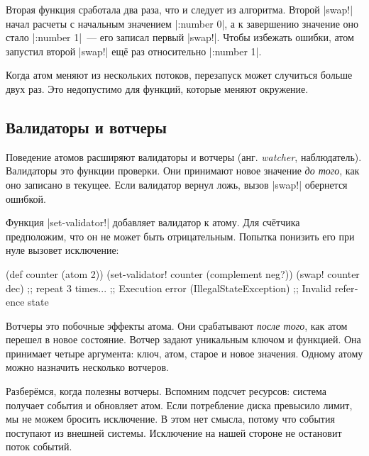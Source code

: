 Вторая функция сработала два раза, что и следует из алгоритма. Второй
\spverb|swap!| начал расчеты с начальным значением \spverb|{:number 0}|, а к
завершению значение оно стало \spverb|{:number 1}|~--- его записал первый
\spverb|swap!|. Чтобы избежать ошибки, атом запустил второй \spverb|swap!| ещ\"{е}
раз относительно \spverb|{:number 1}|.

Когда атом меняют из нескольких потоков, перезапуск может случиться больше двух
раз. Это недопустимо для функций, которые меняют окружение.

\subsection{Валидаторы и вотчеры}


Поведение атомов расширяют валидаторы и вотчеры (анг. \emph{watcher},
наблюдатель). Валидаторы это функции проверки. Они принимают новое значение
\emph{до того}, как оно записано в текущее. Если валидатор вернул ложь, вызов
\spverb|swap!| обернется ошибкой.


Функция \spverb|set-validator!| добавляет валидатор к атому. Для сч\"{е}тчика
предположим, что он не может быть отрицательным. Попытка понизить его при нуле
вызовет исключение:

\begin{english}
  \begin{clojure}
(def counter (atom 2))
(set-validator! counter (complement neg?))
(swap! counter dec) ;; repeat 3 times...
;; Execution error (IllegalStateException)
;; Invalid reference state
  \end{clojure}
\end{english}

Вотчеры это побочные эффекты атома. Они срабатывают \emph{после того}, как атом
перешел в новое состояние. Вотчер задают уникальным ключом и функцией. Она
принимает четыре аргумента: ключ, атом, старое и новое значения. Одному атому
можно назначить несколько вотчеров.

Разбер\"{е}мся, когда полезны вотчеры. Вспомним подсчет ресурсов: система получает
события и обновляет атом. Если потребление диска превысило лимит, мы не можем
бросить исключение. В этом нет смысла, потому что события поступают из внешней
системы. Исключение на нашей стороне не остановит поток событий.


